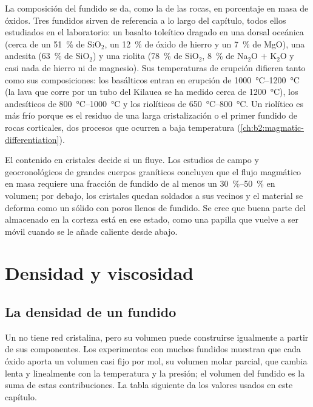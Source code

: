 La composición del fundido se da, como la de las rocas, en porcentaje en masa de
óxidos. Tres fundidos sirven de referencia a lo largo del capítulo, todos ellos
estudiados en el laboratorio: un basalto toleítico dragado en una dorsal oceánica
(cerca de un \qty{51}{\percent} de SiO$_2$, un \qty{12}{\percent} de óxido de hierro y un \qty{7}{\percent} de
MgO), una andesita (\qty{63}{\percent} de SiO$_2$) y una riolita (\qty{78}{\percent} de
SiO$_2$, \qty{8}{\percent} de Na$_2$O $+$ K$_2$O y casi nada de hierro ni de magnesio).
Sus temperaturas de erupción difieren tanto como sus composiciones: los 
basálticos entran en erupción de \qtyrange{1000}{1200}{\celsius} (la lava que corre por un tubo del
Kilauea se ha medido cerca de \qty{1200}{\celsius}), los andesíticos de
\qtyrange{800}{1000}{\celsius} y los riolíticos de \qtyrange{650}{800}{\celsius}.
Un  riolítico es más frío porque es el residuo de una larga cristalización
o el primer fundido de rocas corticales, dos procesos que ocurren a baja temperatura
(\cref{ch:b2:magmatic-differentiation}).

El contenido en cristales decide si un  fluye. Los estudios de campo y geocronológicos
de grandes cuerpos graníticos concluyen que el flujo magmático en masa requiere una fracción
de fundido de al menos un \qtyrange{30}{50}{\percent} en volumen; por debajo, los
cristales quedan soldados a sus vecinos y el material se deforma como un sólido con
poros llenos de fundido. Se cree que buena parte del  almacenado en la corteza está en
ese estado, como una papilla que vuelve a ser móvil cuando se le añade  caliente desde
abajo.

\section{Densidad y viscosidad}

\subsection{La densidad de un fundido}

Un  no tiene red cristalina, pero su volumen puede construirse igualmente a partir de
sus componentes. Los experimentos con muchos fundidos muestran que cada óxido aporta un
volumen casi fijo por mol, su volumen molar parcial, que cambia lenta y
linealmente con la temperatura y la presión; el volumen del fundido es la suma de
estas contribuciones. La tabla siguiente da los valores usados en este capítulo.

